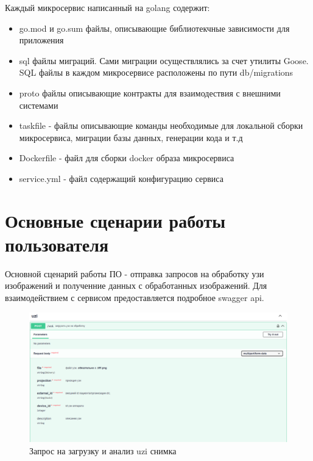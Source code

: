Каждый микросервис написанный на golang содержит:
\begin{itemize}
  \item go.mod и go.sum файлы, описывающие библиотекчные зависимости для приложения
  \item sql файлы миграций. Сами миграции осуществлялись за счет утилиты Goose. SQL файлы в каждом микросервисе расположены по пути db/migrations
  \item proto файлы описывающие контракты для взаимодествия с внешними системами
  \item taskfile - файлы описывающие команды необходимые для локальной сборки микросервиса, миграции базы данных, генерации кода и т.д
  \item Dockerfile - файл для сборки docker образа микросервиса
  \item service.yml - файл содержащий конфигурацию сервиса
\end{itemize}




\section{Основные сценарии работы пользователя}
Основной сценарий работы ПО - отправка запросов на обработку узи изображений и полученние данных с
обработанных изображений. Для взаимодействием с сервисом предоставляется подробное swagger api.

\begin{figure}[H]%
	\begin{center}
		\includegraphics[width=.6\columnwidth]{./img/new/uzi_request.png}%
	\end{center}
	\caption{Запрос на загрузку и анализ uzi снимка}%
	\label{pic:uzi_request}%
\end{figure}

